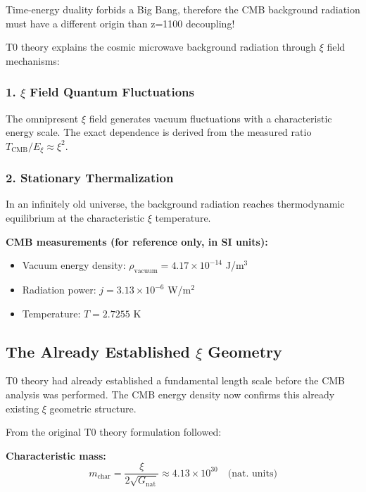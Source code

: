 	\begin{revolutionary}
		Time-energy duality forbids a Big Bang, therefore the CMB background radiation must have a different origin than z=1100 decoupling!
	\end{revolutionary}
	
	T0 theory explains the cosmic microwave background radiation through $\xi$ field mechanisms:
	
	\subsubsection{1. $\xi$ Field Quantum Fluctuations}
	The omnipresent $\xi$ field generates vacuum fluctuations with a characteristic energy scale. The exact dependence is derived from the measured ratio $T_{\text{CMB}}/E_\xi \approx \xi^2$.
	
	\subsubsection{2. Stationary Thermalization}
	In an infinitely old universe, the background radiation reaches thermodynamic equilibrium at the characteristic $\xi$ temperature.
	
	\begin{sibox}
		\textbf{CMB measurements (for reference only, in SI units):}
		\begin{itemize}
			\item Vacuum energy density: $\rho_{\text{vacuum}} = 4.17 \times 10^{-14}$ J/m$^3$
			\item Radiation power: $j = 3.13 \times 10^{-6}$ W/m$^2$
			\item Temperature: $T = 2.7255$ K
		\end{itemize}
	\end{sibox}
	
	\subsection{The Already Established $\xi$ Geometry}
	
	\begin{important}
		T0 theory had already established a fundamental length scale before the CMB analysis was performed. The CMB energy density now confirms this already existing $\xi$ geometric structure.
	\end{important}
	
	From the original T0 theory formulation followed:
	
	\textbf{Characteristic mass:}
	\begin{equation}
		m_{\text{char}} = \frac{\xi}{2\sqrt{G_{\text{nat}}}} \approx 4.13 \times 10^{30} \quad \text{(nat. units)}
	\end{equation}
	
